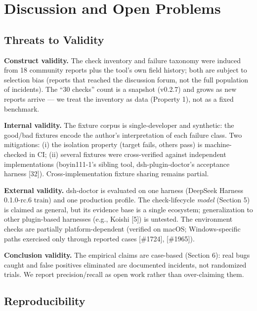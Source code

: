 \documentclass[11pt]{article}
\begin{document}
\section{Discussion and Open
Problems}\label{discussion-and-open-problems}

\subsection{Threats to Validity}\label{threats-to-validity}

\textbf{Construct validity.} The check inventory and failure taxonomy
were induced from 18 community reports plus the tool's own field
history; both are subject to selection bias (reports that reached the
discussion forum, not the full population of incidents). The ``30
checks'' count is a snapshot (v0.2.7) and grows as new reports arrive
--- we treat the inventory as data (Property 1), not as a fixed
benchmark.

\textbf{Internal validity.} The fixture corpus is single-developer and
synthetic: the good/bad fixtures encode the author's interpretation of
each failure class. Two mitigations: (i) the isolation property (target
fails, others pass) is machine-checked in CI; (ii) several fixtures were
cross-verified against independent implementations (boyin111-1's sibling
tool, dsh-plugin-doctor's acceptance harness [32]).
Cross-implementation fixture sharing remains partial.

\textbf{External validity.} dsh-doctor is evaluated on one harness
(DeepSeek Harness 0.1.0-rc.6 train) and one production profile. The
check-lifecycle \emph{model} (Section 5) is claimed as general, but its
evidence base is a single ecosystem; generalization to other
plugin-based harnesses (e.g., Koishi [5]) is untested. The
environment checks are partially platform-dependent (verified on macOS;
Windows-specific paths exercised only through reported cases
[\#1724], [\#1965]).

\textbf{Conclusion validity.} The empirical claims are case-based
(Section 6): real bugs caught and false positives eliminated are
documented incidents, not randomized trials. We report precision/recall
as open work rather than over-claiming them.

\subsection{Reproducibility}\label{reproducibility}
\end{document}
